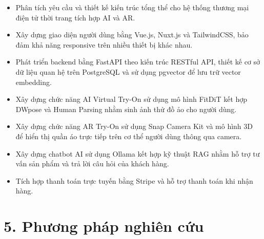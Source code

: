 \begin{itemize}
    \item Phân tích yêu cầu và thiết kế kiến trúc tổng thể cho hệ thống thương mại điện tử thời trang tích hợp AI và AR.
    
    \item Xây dựng giao diện người dùng bằng Vue.js, Nuxt.js và TailwindCSS, bảo đảm khả năng responsive trên nhiều thiết bị khác nhau.
    
    \item Phát triển backend bằng FastAPI theo kiến trúc RESTful API, thiết kế cơ sở dữ liệu quan hệ trên PostgreSQL và sử dụng pgvector để lưu trữ vector embedding.
    
    \item Xây dựng chức năng AI Virtual Try-On sử dụng mô hình FitDiT kết hợp DWpose và Human Parsing nhằm sinh ảnh thử đồ ảo cho người dùng.
    
    \item Xây dựng chức năng AR Try-On sử dụng Snap Camera Kit và mô hình 3D để hiển thị quần áo trực tiếp trên cơ thể người dùng thông qua camera.
    
    \item Xây dựng chatbot AI sử dụng Ollama kết hợp kỹ thuật RAG nhằm hỗ trợ tư vấn sản phẩm và trả lời câu hỏi của khách hàng.
    
    \item Tích hợp thanh toán trực tuyến bằng Stripe và hỗ trợ thanh toán khi nhận hàng.
    
\end{itemize}

\section*{5. Phương pháp nghiên cứu}


